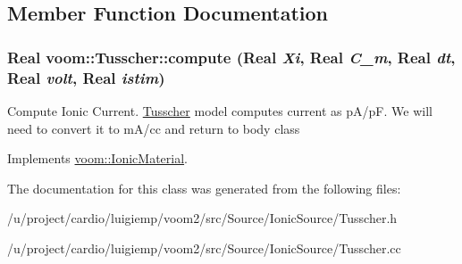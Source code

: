 \subsection{Member Function Documentation}
\hypertarget{classvoom_1_1_tusscher_a6ca3b7ba35dc82631a371d248fe5749b}{
\subsubsection[{compute}]{\setlength{\rightskip}{0pt plus 5cm}Real voom::Tusscher::compute (Real {\em Xi}, \/  Real {\em C\_\-m}, \/  Real {\em dt}, \/  Real {\em volt}, \/  Real {\em istim})}}
\label{classvoom_1_1_tusscher_a6ca3b7ba35dc82631a371d248fe5749b}


Compute Ionic Current. \hyperlink{classvoom_1_1_tusscher}{Tusscher} model computes current as pA/pF. We will need to convert it to mA/cc and return to body class 

Implements \hyperlink{classvoom_1_1_ionic_material_a1b95cf90af115374b428f2e5ece571cb}{voom::IonicMaterial}.

The documentation for this class was generated from the following files:\begin{DoxyCompactItemize}
\item 
/u/project/cardio/luigiemp/voom2/src/Source/IonicSource/Tusscher.h\item 
/u/project/cardio/luigiemp/voom2/src/Source/IonicSource/Tusscher.cc\end{DoxyCompactItemize}
